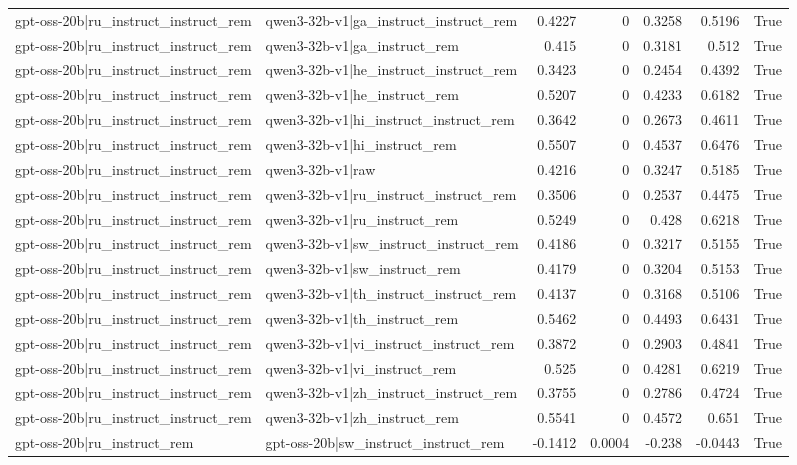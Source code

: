 \begin{table}
\begin{tabular}{l l r r r r l}
gpt-oss-20b|ru_instruct_instruct_rem & qwen3-32b-v1|ga_instruct_instruct_rem & 0.4227 & 0 & 0.3258 & 0.5196 & True \\
gpt-oss-20b|ru_instruct_instruct_rem & qwen3-32b-v1|ga_instruct_rem & 0.415 & 0 & 0.3181 & 0.512 & True \\
gpt-oss-20b|ru_instruct_instruct_rem & qwen3-32b-v1|he_instruct_instruct_rem & 0.3423 & 0 & 0.2454 & 0.4392 & True \\
gpt-oss-20b|ru_instruct_instruct_rem & qwen3-32b-v1|he_instruct_rem & 0.5207 & 0 & 0.4233 & 0.6182 & True \\
gpt-oss-20b|ru_instruct_instruct_rem & qwen3-32b-v1|hi_instruct_instruct_rem & 0.3642 & 0 & 0.2673 & 0.4611 & True \\
gpt-oss-20b|ru_instruct_instruct_rem & qwen3-32b-v1|hi_instruct_rem & 0.5507 & 0 & 0.4537 & 0.6476 & True \\
gpt-oss-20b|ru_instruct_instruct_rem & qwen3-32b-v1|raw & 0.4216 & 0 & 0.3247 & 0.5185 & True \\
gpt-oss-20b|ru_instruct_instruct_rem & qwen3-32b-v1|ru_instruct_instruct_rem & 0.3506 & 0 & 0.2537 & 0.4475 & True \\
gpt-oss-20b|ru_instruct_instruct_rem & qwen3-32b-v1|ru_instruct_rem & 0.5249 & 0 & 0.428 & 0.6218 & True \\
gpt-oss-20b|ru_instruct_instruct_rem & qwen3-32b-v1|sw_instruct_instruct_rem & 0.4186 & 0 & 0.3217 & 0.5155 & True \\
gpt-oss-20b|ru_instruct_instruct_rem & qwen3-32b-v1|sw_instruct_rem & 0.4179 & 0 & 0.3204 & 0.5153 & True \\
gpt-oss-20b|ru_instruct_instruct_rem & qwen3-32b-v1|th_instruct_instruct_rem & 0.4137 & 0 & 0.3168 & 0.5106 & True \\
gpt-oss-20b|ru_instruct_instruct_rem & qwen3-32b-v1|th_instruct_rem & 0.5462 & 0 & 0.4493 & 0.6431 & True \\
gpt-oss-20b|ru_instruct_instruct_rem & qwen3-32b-v1|vi_instruct_instruct_rem & 0.3872 & 0 & 0.2903 & 0.4841 & True \\
gpt-oss-20b|ru_instruct_instruct_rem & qwen3-32b-v1|vi_instruct_rem & 0.525 & 0 & 0.4281 & 0.6219 & True \\
gpt-oss-20b|ru_instruct_instruct_rem & qwen3-32b-v1|zh_instruct_instruct_rem & 0.3755 & 0 & 0.2786 & 0.4724 & True \\
gpt-oss-20b|ru_instruct_instruct_rem & qwen3-32b-v1|zh_instruct_rem & 0.5541 & 0 & 0.4572 & 0.651 & True \\
gpt-oss-20b|ru_instruct_rem & gpt-oss-20b|sw_instruct_instruct_rem & -0.1412 & 0.0004 & -0.238 & -0.0443 & True \\

\end{tabular}
\end{table}
